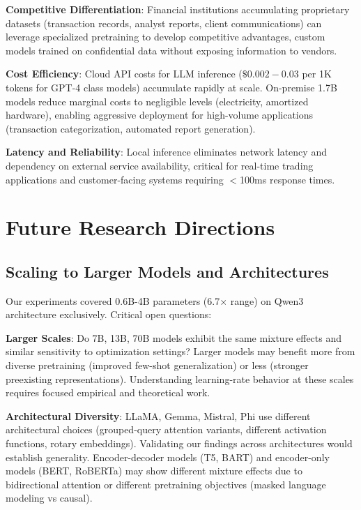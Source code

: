 \textbf{Competitive Differentiation}: Financial institutions accumulating proprietary datasets (transaction records, analyst reports, client communications) can leverage specialized pretraining to develop competitive advantages, custom models trained on confidential data without exposing information to vendors.

\textbf{Cost Efficiency}: Cloud API costs for LLM inference ($\$0.002-0.03$ per 1K tokens for GPT-4 class models) accumulate rapidly at scale. On-premise 1.7B models reduce marginal costs to negligible levels (electricity, amortized hardware), enabling aggressive deployment for high-volume applications (transaction categorization, automated report generation).

\textbf{Latency and Reliability}: Local inference eliminates network latency and dependency on external service availability, critical for real-time trading applications and customer-facing systems requiring $<$100ms response times.

\section{Future Research Directions}

\subsection{Scaling to Larger Models and Architectures}

Our experiments covered 0.6B-4B parameters (6.7$\times$ range) on Qwen3 architecture exclusively. Critical open questions:

\textbf{Larger Scales}: Do 7B, 13B, 70B models exhibit the same mixture effects and similar sensitivity to optimization settings? Larger models may benefit more from diverse pretraining (improved few-shot generalization) or less (stronger preexisting representations). Understanding learning-rate behavior at these scales requires focused empirical and theoretical work.

\textbf{Architectural Diversity}: LLaMA, Gemma, Mistral, Phi use different architectural choices (grouped-query attention variants, different activation functions, rotary embeddings). Validating our findings across architectures would establish generality. Encoder-decoder models (T5, BART) and encoder-only models (BERT, RoBERTa) may show different mixture effects due to bidirectional attention or different pretraining objectives (masked language modeling vs causal).

